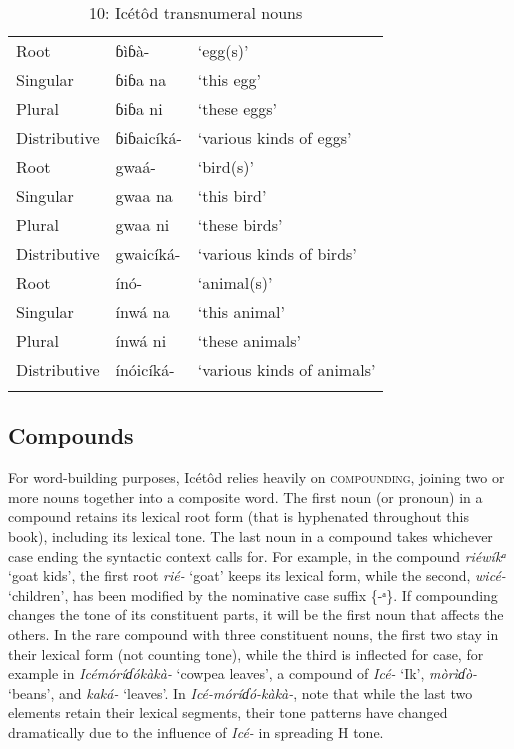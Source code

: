 \begin{table}
\caption{10: Icétôd transnumeral nouns}
\label{tab:4}


\begin{tabularx}{\textwidth}{XXX}
\lsptoprule

Root & ɓìɓà- & ‘egg(s)’\\
Singular & ɓiɓa na & ‘this egg’\\
Plural & ɓiɓa ni & ‘these eggs’\\
Distributive & ɓiɓaicíká- & ‘various kinds of eggs’\\
Root & gwaá- & ‘bird(s)’\\
Singular & gwaa na & ‘this bird’\\
Plural & gwaa ni & ‘these birds’\\
Distributive & gwaicíká- & ‘various kinds of birds’\\
Root & ínó- & ‘animal(s)’\\
Singular & ínwá na & ‘this animal’\\
Plural & ínwá ni & ‘these animals’\\
Distributive & ínóicíká- & ‘various kinds of animals’\\
\lspbottomrule
\end{tabularx}
\end{table}



\subsection{Compounds}


For word-building purposes, Icétôd relies heavily on \textsc{compounding}, joining two or more nouns together into a composite word. The first noun (or pronoun) in a compound retains its lexical root form (that is hyphenated throughout this book), including its lexical tone. The last noun in a compound takes whichever case ending the syntactic context calls for. For example, in the compound \textit{riéwíkᵃ }‘goat kids’, the first root \textit{rié- }‘goat’ keeps its lexical form, while the second, \textit{wicé- }‘children’, has been modified by the nominative case suffix \{-ᵃ\}. If compounding changes the tone of its constituent parts, it will be the first noun that affects the others. In the rare compound with three constituent nouns, the first two stay in their lexical form (not counting tone), while the third is inflected for case, for example in \textit{Icémóríɗókàkà- }‘cowpea leaves’, a compound of \textit{Icé- }‘Ik’, \textit{mòrìɗò- }‘beans’, and \textit{kaká- }‘leaves’. In \textit{Icé-móríɗó-kàkà-}, note that while the last two elements retain their lexical segments, their tone patterns have changed dramatically due to the influence of \textit{Icé-} in spreading H tone.

